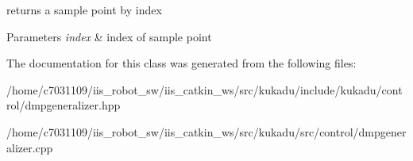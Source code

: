 returns a sample point by index 


\begin{DoxyParams}{Parameters}
{\em index} & index of sample point \\
\hline
\end{DoxyParams}


The documentation for this class was generated from the following files\-:\begin{DoxyCompactItemize}
\item 
/home/c7031109/iis\-\_\-robot\-\_\-sw/iis\-\_\-catkin\-\_\-ws/src/kukadu/include/kukadu/control/dmpgeneralizer.\-hpp\item 
/home/c7031109/iis\-\_\-robot\-\_\-sw/iis\-\_\-catkin\-\_\-ws/src/kukadu/src/control/dmpgeneralizer.\-cpp\end{DoxyCompactItemize}
